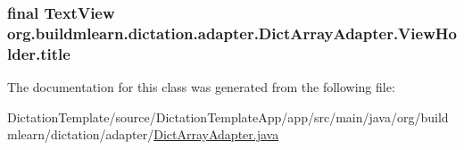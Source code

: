 \subsubsection[{\texorpdfstring{title}{title}}]{\setlength{\rightskip}{0pt plus 5cm}final Text\+View org.\+buildmlearn.\+dictation.\+adapter.\+Dict\+Array\+Adapter.\+View\+Holder.\+title}\hypertarget{classorg_1_1buildmlearn_1_1dictation_1_1adapter_1_1DictArrayAdapter_1_1ViewHolder_a0be058842214daeff52045e4f2436e50}{}\label{classorg_1_1buildmlearn_1_1dictation_1_1adapter_1_1DictArrayAdapter_1_1ViewHolder_a0be058842214daeff52045e4f2436e50}


The documentation for this class was generated from the following file\+:\begin{DoxyCompactItemize}
\item 
Dictation\+Template/source/\+Dictation\+Template\+App/app/src/main/java/org/buildmlearn/dictation/adapter/\hyperlink{DictArrayAdapter_8java}{Dict\+Array\+Adapter.\+java}\end{DoxyCompactItemize}
